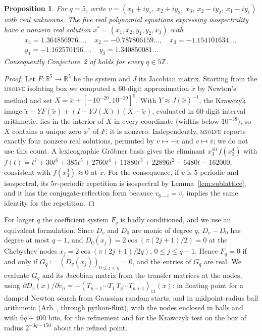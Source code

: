 \documentclass[11pt,reqno]{amsart}
\newtheorem{proposition}[theorem]{Proposition}
\theoremstyle{definition}
\theoremstyle{remark}
\newcommand{\Z}{\mathbb Z}
\newcommand{\R}{\mathbb R}
\begin{document}
\begin{proposition}\label{prop:conj2}
For $q=5$, write $v=(x_1+iy_1,\ x_2+iy_2,\ x_3,\ x_2-iy_2,\ x_1-iy_1)$ with real
unknowns.  The five real polynomial equations expressing isospectrality have a
nonzero real solution $x^*=(x_1,x_2,y_1,y_2,x_3)$ with
\[
 \begin{gathered}
 x_1=1.364856976\ldots,\quad x_2=-0.787806159\ldots,\quad x_3=-1.154101634\ldots,\\
 y_1=-1.162570196\ldots,\quad y_2=1.340850081\ldots
 \end{gathered}
\]
Consequently Conjecture~2 of \cite{FFORS2026} holds for every $q\in5\Z$.
\end{proposition}

\begin{proof}
Let $F\colon\R^5\to\R^5$ be the system and $J$ its Jacobian matrix.  Starting
from the \textsc{msolve} isolating box we computed a $60$-digit approximation
$\tilde x$ by Newton's method and set $X=\tilde x+[-10^{-20},10^{-20}]^5$.
With $Y\approx J(\tilde x)^{-1}$, the Krawczyk image
$\tilde x-YF(\tilde x)+(I-YJ(X))(X-\tilde x)$, evaluated in $60$-digit interval
arithmetic, lies in the interior of $X$ in every coordinate (widths below
$10^{-38}$), so $X$ contains a unique zero $x^*$ of $F$; it is nonzero.  Independently, \textsc{msolve} reports
exactly four nonzero real solutions, permuted by $v\mapsto-v$ and
$v\mapsto\overline v$; we do not use this count.  A lexicographic Gr\"obner basis
gives the eliminant $x_3^{10}\,f(x_3^4)$ with
$f(t)=t^7+30t^6+385t^5+2760t^4+11880t^3+22896t^2-6480t-162000$, consistent
with $f(x_3^4)\approx0$ at $\tilde x$.  For the
consequence, if $v$ is $5$-periodic and isospectral, its $5r$-periodic repetition
is isospectral by Lemma~\ref{lem:sublattice}, and it has the conjugate-reflection
form because $v_{6-i}=\overline{v_i}$ implies the same identity for the repetition.
\end{proof}

For larger $q$ the coefficient system $F_q$ is badly conditioned, and we use
an equivalent formulation.  Since $D_v$ and $D_0$ are monic of degree $q$,
$D_v-D_0$ has degree at most $q-1$, and $D_0(x_j)=2\cos(\pi(2j+1)/2)=0$ at the
Chebyshev nodes $x_j=2\cos(\pi(2j+1)/2q)$, $0\le j\le q-1$.  Hence $F_q=0$ if
and only if $G_q:=(D_v(x_j))_{0\le j<q}=0$, and the entries of $G_q$ are real.
We evaluate $G_q$ and its Jacobian matrix from the transfer matrices at the
nodes, using $\partial D_v(x)/\partial v_n=-(T_{n-1}\cdots T_1\,T_q\cdots T_{n+1})_{11}(x)$:
in floating point for a damped Newton search from Gaussian random starts, and
in midpoint-radius ball arithmetic (Arb~\cite{Arb2017}, through python-flint),
with the nodes enclosed in balls and with $6q+400$ bits, for the refinement and
for the Krawczyk test on the box of radius $2^{-3q-150}$ about the refined
point.
\end{document}
